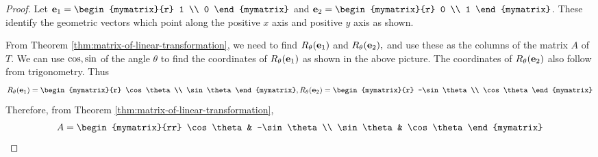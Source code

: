 \begin{proof}
Let $\vect{e}_{1} = \begin{mymatrix}{r}
1 \\
0
\end{mymatrix} $ and $\vect{e}_{2} = \begin{mymatrix}{r}
0 \\
1
\end{mymatrix}$. These identify the geometric vectors which point along the
positive $x$ axis and positive $y$ axis as shown.

\begin{center}
\end{center}
 
From Theorem \ref{thm:matrix-of-linear-transformation}, we need to find $R_{\theta}(\mbox{\bf e}_{1})$ and $R_{\theta}(\mbox{\bf e}_{2}), $
and use these as the columns of the matrix $A$ of $T$. We can use  
$\mbox{\rm cos},\mbox{\rm sin}$ of the angle $\theta$ to find the coordinates of $R_{\theta}(\mbox{\bf e}_{1})$ as shown
in the above picture. The coordinates of $R_{\theta}(\mbox{\bf e}_{2})$ also follow from
trigonometry. Thus
\begin{equation*}
R_{\theta}(\vect{e}_{1})=\begin{mymatrix}{r}
\cos \theta \\
\sin \theta
\end{mymatrix} ,R_{\theta}(\vect{e}_{2})=\begin{mymatrix}{r}
-\sin \theta \\
\cos \theta
\end{mymatrix} 
\end{equation*}
Therefore, from Theorem \ref{thm:matrix-of-linear-transformation},
\begin{equation*}
A=\begin{mymatrix}{rr}
\cos \theta & -\sin \theta \\
\sin \theta & \cos \theta
\end{mymatrix}
\end{equation*}


\end{proof}
